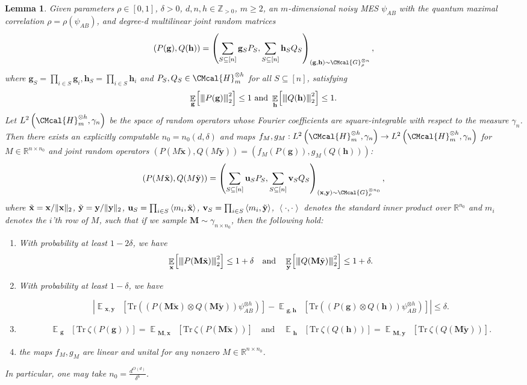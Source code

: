 \documentclass[10pt,a4paper]{article}
\def\G{\CMcal{G}}
\def\H{\CMcal{H}}
\theoremstyle{plain}
\newtheorem{lemma}[theorem]{Lemma}
\theoremstyle{definition}
\newcommand {\minusspace} {\: \! \!}
\newcommand {\Fn} [2] {\ensuremath{ #1 \minusspace \Br{ #2 } }}
\newcommand{\reals}{{\mathbb R}}
\newcommand {\innerproduct} [2] {\ensuremath{\left \langle #1 , #2 \right \rangle}}
\newcommand {\br} [1] {\ensuremath{ \left( #1 \right) }}
\newcommand {\Br} [1] {\ensuremath{ \left[ #1 \right] }}
\DeclarePairedDelimiter{\norm}{\lVert}{\rVert}
\newcommand {\ab} [1] {\ensuremath{ \left| #1 \right| }}
\DeclareMathOperator*{\bigE}{\mathbb{E}}
\newcommand {\expec} [2] {\Fn{\bigE_{\substack{#1}}}{#2}}
\newcommand{\nnorm}[1]{{\left\vert\kern-0.25ex\left\vert\kern-0.25ex\left\vert #1
		\right\vert\kern-0.25ex\right\vert\kern-0.25ex\right\vert}}
\newcommand {\Tr} {\ensuremath{ \mathrm{Tr} }}
\newcommand{\posint}{{\mathbb Z}_{>0}}
\newcommand{\randg}{\ensuremath{\mathbf{g}}}
\newcommand{\randh}{\ensuremath{\mathbf{h}}}
\newcommand{\randx}{\ensuremath{\mathbf{x}}}
\newcommand{\randy}{\ensuremath{\mathbf{y}}}
\newcommand{\randu}{\ensuremath{\mathbf{u}}}
\newcommand{\randv}{\ensuremath{\mathbf{v}}}
\newcommand{\randM}{\ensuremath{\mathbf{M}}}
\newcommand{\herspace}[1]{\ensuremath{\H_m^{\otimes #1}}}
\newcommand{\1}{\mathbb{1}} %
\begin{document}
\begin{lemma}\cite[Lemma 5.13]{qin_et_al:LIPIcs.ICALP.2023.97}\label{lem:expectationdimensionreduction}
Given parameters $\rho\in\Br{0,1}$, $\delta>0$, $d,n,h\in\posint$, $m\geq2$, an $m$-dimensional noisy MES $\psi_{AB}$ with the quantum maximal correlation $\rho=\rho(\psi_{AB})$, and degree-d multilinear joint random matrices 
\[
\br{P(\randg),Q(\randh)}=\br{\sum_{S\subseteq[n]}\mathbf{g}_S P_S,\sum_{S\subseteq[n]}\mathbf{h}_S Q_S}_{\br{\mathbf{g},\mathbf{h}}\sim\G_\rho^{\otimes n}},
\]
where $\mathbf{g}_S=\prod_{i\in S}\mathbf{g}_i, \mathbf{h}_S=\prod_{i\in S}\mathbf{h}_i$ and $ P_S, Q_S\in\H_m^{\otimes h}$ for all $S\subseteq[n]$, satisfying 
\[\expec{\randg}{\nnorm{P(\randg)}_2^2}\leq1~\mbox{and}~\expec{\randh}{\nnorm{Q(\randh)}_2^2}\leq1.\] 
Let $L^2\br{\herspace{h},\gamma_{n}}$ be the space of random operators whose Fourier coefficients are square-integrable with respect to the measure $\gamma_n$. Then there exists an explicitly computable $n_0=n_0(d,\delta)$ and maps $f_M,g_M: L^2\br{\herspace{h},\gamma_{n}}\rightarrow L^2\br{\herspace{h},\gamma_{n}}$ for $M\in\reals^{n\times n_0}$ and joint random operators $\br{P(M\tilde{\randx}),Q(M\tilde{\randy})}=\br{f_M(P(\randg)),g_M(Q(\randh))}$:
 \[
\br{P(M\tilde{\randx}),Q(M\tilde{\randy})}=\br{\sum_{S\subseteq[n]}\randu_S P_S,\sum_{S\subseteq[n]}\randv_S Q_S}_{\br{\mathbf{x},\mathbf{y}}\sim\G_\rho^{\otimes n_0}},
\]
where $\tilde{\randx}=\randx/\norm{\randx}_2$, $\tilde{\randy}=\randy/\norm{\randy}_2$, $\mathbf\randu_S=\prod_{i\in S}\innerproduct{m_i}{\tilde{\randx}}$, $\mathbf\randv_S=\prod_{i\in S}\innerproduct{m_i}{\tilde{\randy}}$, $\innerproduct{\cdot}{\cdot}$ denotes the standard inner product over $\reals^{n_0}$ and $m_i$ denotes the $i$'th row of $M$, such that if we sample $\mathbf{M}\sim\gamma_{n\times n_0}$, then the following hold:
\begin{enumerate}
\item 
With probability at least $1-2\delta$, we have 
\[\expec{\randx}{\nnorm{P(\randM\tilde{\randx})}_2^2}\leq1+\delta\quad\mbox{and}\quad\expec{\randy}{\nnorm{Q(\randM\tilde{\randy})}_2^2}\leq1+\delta.\]

\item With probability at least $1-\delta$, we have 

\[\ab{\expec{\mathbf{x},\mathbf{y}}{\Tr\br{\br{P(\randM\tilde{\randx})\otimes Q(\randM\tilde{\randy})}\psi_{AB}^{\otimes h}}}-\expec{\mathbf{g},\mathbf{h}}{\Tr\br{\br{P(\randg)\otimes Q(\randh)}\psi_{AB}^{\otimes h}}}}\leq\delta.\]

\item \[\expec{\randg}{\Tr~\zeta\br{P(\randg)}}=\expec{\randM,\randx}{\Tr~\zeta\br{P(\randM\tilde{\randx})}}\quad\mbox{and}\quad\expec{\randh}{\Tr~\zeta\br{Q(\randh)}}=\expec{\randM,\randy}{\Tr~\zeta\br{Q(\randM\tilde{\randy})}}.\]

\item the maps $f_M, g_M$ are linear and unital for any nonzero $M\in\reals^{n\times n_0}$.
\end{enumerate}


In particular, one may take $n_0=\frac{d^{O(d)}}{\delta^6}$.
\end{lemma}
\end{document}
